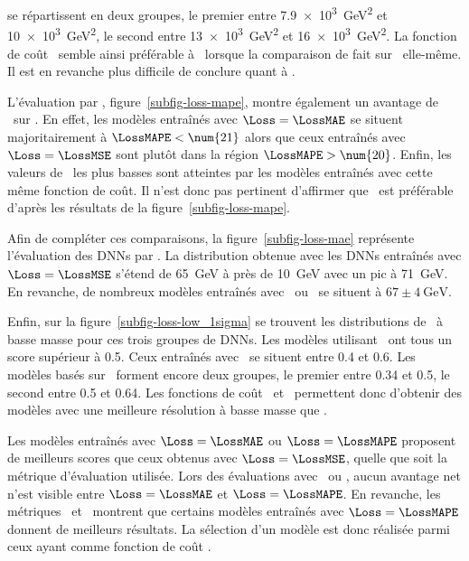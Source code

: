 se répartissent en deux groupes,
le premier
entre \SI{7.9e3}{\GeV^2} et \SI{10e3}{\GeV^2},
le second
entre \SI{13e3}{\GeV^2} et \SI{16e3}{\GeV^2}.
La fonction de coût \LossMAE\ semble ainsi préférable à \LossMSE\ lorsque la comparaison de fait sur \LossMSE\ elle-même.
Il est en revanche plus difficile de conclure quant à \LossMAPE.
\par
L'évaluation par \LossMAPE, figure~\ref{subfig-loss-mape},
montre également un avantage de \LossMAE\ sur \LossMSE.
En effet, les modèles
entraînés avec $\Loss=\LossMAE$
se situent majoritairement à $\LossMAPE<\num{21}$
alors que ceux
entraînés avec $\Loss=\LossMSE$
sont plutôt dans la région $\LossMAPE>\num{20}$.
Enfin, les valeurs de \LossMAPE\ les plus basses sont atteintes par les modèles entraînés avec cette même fonction de coût.
Il n'est donc pas pertinent d'affirmer que \LossMAPE\ est préférable d'après les résultats de la figure~\ref{subfig-loss-mape}.
\par
Afin de compléter ces comparaisons,
la figure~\ref{subfig-loss-mae} représente l'évaluation des DNNs par \LossMAE.
La distribution obtenue avec les DNNs entraînés avec $\Loss=\LossMSE$
s'étend de \SI{65}{\GeV} à près de \SI{10}{\GeV} avec un pic à \SI{71}{\GeV}.
En revanche, de nombreux modèles entraînés avec \LossMAE\ ou \LossMAPE\
se situent à $\num{67}\pm\SI{4}{\GeV}$.
\par
Enfin,
sur la figure~\ref{subfig-loss-low_1sigma} se trouvent les distributions
de \OneSigmaWidth\ à basse masse pour ces trois groupes de DNNs.
Les modèles utilisant \LossMSE\ ont tous un score supérieur à \num{0.5}.
Ceux entraînés avec \LossMAE\ se situent entre \num{0.4} et \num{0.6}.
Les modèles basés sur \LossMAPE\ forment encore deux groupes,
le premier entre \num{0.34} et \num{0.5},
le second entre \num{0.5} et \num{0.64}.
Les fonctions de coût \LossMAPE\ et \LossMAE\ permettent donc d'obtenir des modèles avec une meilleure résolution à basse masse que \LossMSE.
\par
Les modèles entraînés avec $\Loss=\LossMAE$ ou $\Loss=\LossMAPE$
proposent de meilleurs scores que ceux obtenus avec $\Loss=\LossMSE$,
quelle que soit la métrique d'évaluation utilisée.
Lors des évaluations avec \LossMSE\ ou \LossMAE,
aucun avantage net n'est visible entre $\Loss=\LossMAE$ et $\Loss=\LossMAPE$.
En revanche, les métriques \LossMAPE\ et \OneSigmaWidth\ montrent que certains modèles
entraînés avec $\Loss=\LossMAPE$
donnent de meilleurs résultats.
La sélection d'un modèle est donc réalisée parmi ceux ayant comme fonction de coût \LossMAPE.
